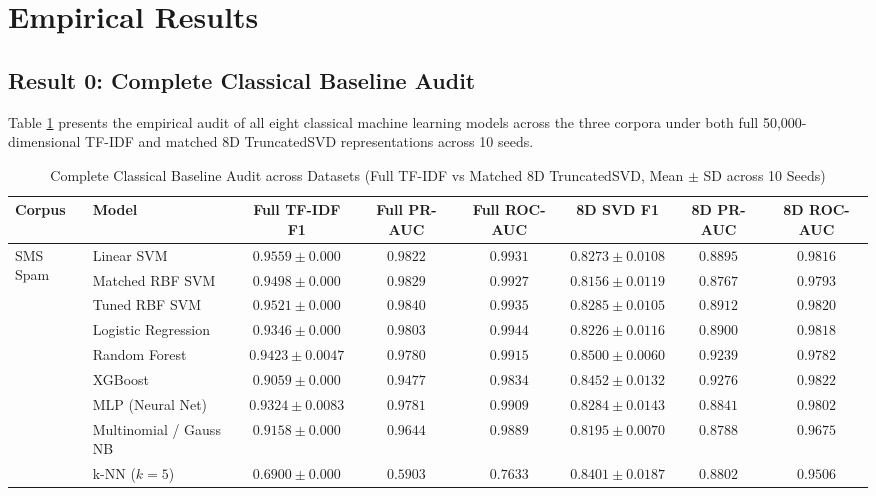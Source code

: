 \documentclass[10pt,twocolumn,letterpaper]{article}
\begin{document}
\section{Empirical Results}
\label{sec:results}

\subsection{Result 0: Complete Classical Baseline Audit}
\label{sec:res_classical}
Table \ref{tab:classical_baselines_summary} presents the empirical audit of all eight classical machine learning models across the three corpora under both full 50,000-dimensional TF-IDF and matched 8D TruncatedSVD representations across 10 seeds.

\begin{table}[t]
\centering
\scriptsize
\caption{Complete Classical Baseline Audit across Datasets (Full TF-IDF vs Matched 8D TruncatedSVD, Mean $\pm$ SD across 10 Seeds)}
\label{tab:classical_baselines_summary}
\setlength{\tabcolsep}{2.5pt}
\begin{tabular}{llcccccc}
\toprule
Corpus & Model & Full TF-IDF F1 & Full PR-AUC & Full ROC-AUC & 8D SVD F1 & 8D PR-AUC & 8D ROC-AUC \\
\midrule
\multirow{8}{*}{SMS Spam} 
 & Linear SVM & $0.9559 \pm 0.000$ & $0.9822$ & $0.9931$ & $0.8273 \pm 0.0108$ & $0.8895$ & $0.9816$ \\
 & Matched RBF SVM & $0.9498 \pm 0.000$ & $0.9829$ & $0.9927$ & $0.8156 \pm 0.0119$ & $0.8767$ & $0.9793$ \\
 & Tuned RBF SVM & $0.9521 \pm 0.000$ & $0.9840$ & $0.9935$ & $0.8285 \pm 0.0105$ & $0.8912$ & $0.9820$ \\
 & Logistic Regression & $0.9346 \pm 0.000$ & $0.9803$ & $0.9944$ & $0.8226 \pm 0.0116$ & $0.8900$ & $0.9818$ \\
 & Random Forest & $0.9423 \pm 0.0047$ & $0.9780$ & $0.9915$ & $0.8500 \pm 0.0060$ & $0.9239$ & $0.9782$ \\
 & XGBoost & $0.9059 \pm 0.000$ & $0.9477$ & $0.9834$ & $0.8452 \pm 0.0132$ & $0.9276$ & $0.9822$ \\
 & MLP (Neural Net) & $0.9324 \pm 0.0083$ & $0.9781$ & $0.9909$ & $0.8284 \pm 0.0143$ & $0.8841$ & $0.9802$ \\
 & Multinomial / Gauss NB & $0.9158 \pm 0.000$ & $0.9644$ & $0.9889$ & $0.8195 \pm 0.0070$ & $0.8788$ & $0.9675$ \\
 & k-NN ($k=5$) & $0.6900 \pm 0.000$ & $0.5903$ & $0.7633$ & $0.8401 \pm 0.0187$ & $0.8802$ & $0.9506$ \\

\end{tabular}
\end{table}
\end{document}
